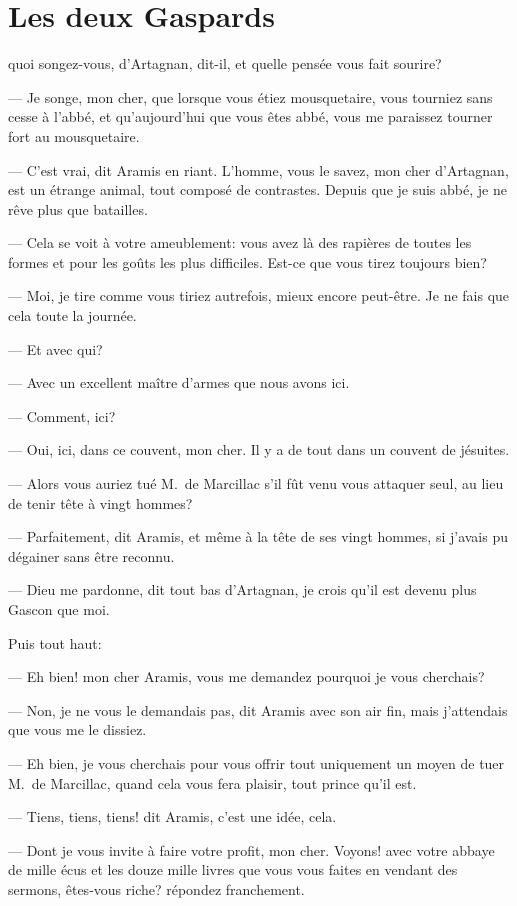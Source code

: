 \chapter{Les deux Gaspards}

\lettrine[ante=—]{}{} quoi songez-vous, d'Artagnan, dit-il, et quelle pensée vous fait sourire?

\zz
— Je songe, mon cher, que lorsque vous étiez mousquetaire, vous tourniez sans cesse à l'abbé, et qu'aujourd'hui que vous êtes abbé, vous me paraissez tourner fort au mousquetaire.

— C'est vrai, dit Aramis en riant. L'homme, vous le savez, mon cher d'Artagnan, est un étrange animal, tout composé de contrastes. Depuis que je suis abbé, je ne rêve plus que batailles.

— Cela se voit à votre ameublement: vous avez là des rapières de toutes les formes et pour les goûts les plus difficiles. Est-ce que vous tirez toujours bien?

— Moi, je tire comme vous tiriez autrefois, mieux encore peut-être. Je ne fais que cela toute la journée.

— Et avec qui?

— Avec un excellent maître d'armes que nous avons ici.

— Comment, ici?

— Oui, ici, dans ce couvent, mon cher. Il y a de tout dans un couvent de jésuites.

— Alors vous auriez tué M.~de Marcillac s'il fût venu vous attaquer seul, au lieu de tenir tête à vingt hommes?

— Parfaitement, dit Aramis, et même à la tête de ses vingt hommes, si j'avais pu dégainer sans être reconnu.

— Dieu me pardonne, dit tout bas d'Artagnan, je crois qu'il est devenu plus Gascon que moi.

Puis tout haut:

— Eh bien! mon cher Aramis, vous me demandez pourquoi je vous cherchais?

— Non, je ne vous le demandais pas, dit Aramis avec son air fin, mais j'attendais que vous me le dissiez.

— Eh bien, je vous cherchais pour vous offrir tout uniquement un moyen de tuer M.~de Marcillac, quand cela vous fera plaisir, tout prince qu'il est.

— Tiens, tiens, tiens! dit Aramis, c'est une idée, cela.

— Dont je vous invite à faire votre profit, mon cher. Voyons! avec votre abbaye de mille écus et les douze mille livres que vous vous faites en vendant des sermons, êtes-vous riche? répondez franchement.

